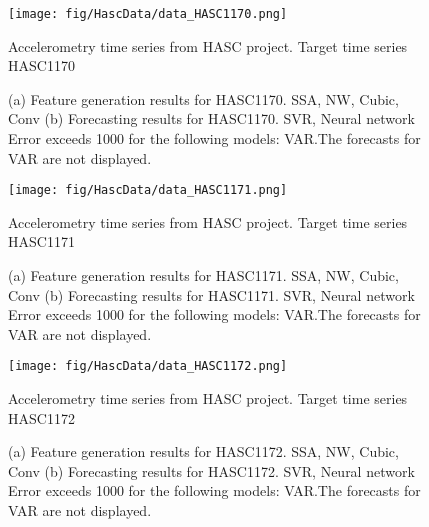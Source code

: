 \documentclass[12pt]{article}
\begin{document}
\begin{figure}
\centering
\texttt{[image: fig/HascData/data\_HASC1170.png]}
\caption{Accelerometry time series from HASC project. Target time series	HASC1170	}
\end{figure}


\begin{figure}
\centering
{}
\caption{(a)	Feature generation results for	HASC1170.	SSA, NW, Cubic, Conv	(b)	Forecasting results for	HASC1170.	SVR, Neural network	Error exceeds 1000 for the following models: VAR.The forecasts for VAR are not displayed.	}
\end{figure}


\begin{figure}
\centering
\texttt{[image: fig/HascData/data\_HASC1171.png]}
\caption{Accelerometry time series from HASC project. Target time series	HASC1171	}
\end{figure}


\begin{figure}
\centering
{}
\caption{(a)	Feature generation results for	HASC1171.	SSA, NW, Cubic, Conv	(b)	Forecasting results for	HASC1171.	SVR, Neural network	Error exceeds 1000 for the following models: VAR.The forecasts for VAR are not displayed.	}
\end{figure}


\begin{figure}
\centering
\texttt{[image: fig/HascData/data\_HASC1172.png]}
\caption{Accelerometry time series from HASC project. Target time series	HASC1172	}
\end{figure}


\begin{figure}
\centering
{}
\caption{(a)	Feature generation results for	HASC1172.	SSA, NW, Cubic, Conv	(b)	Forecasting results for	HASC1172.	SVR, Neural network	Error exceeds 1000 for the following models: VAR.The forecasts for VAR are not displayed.	}
\end{figure}
\end{document}
